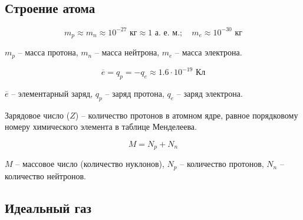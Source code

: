 \documentclass[12pt]{article}
\begin{document}
\subsection{Строение атома}
\begin{law}
    $$m_p\approx m_n\approx 10^{-27}\text{ кг}\approx 1\text{ а. е. м.};\quad m_e\approx 10^{-30} \text{ кг}$$
    \begin{center}
        \begin{minipage}{12cm}
            $m_p$ -- масса протона, $m_n$ -- масса нейтрона, $m_e$ -- масса электрона.
        \end{minipage}
    \end{center}
\end{law}
\begin{law}
    $$\overline{e}=q_p=-q_e\approx \num{1.6}\cdot 10^{-19}\text{ Кл}$$
    \begin{center}
        \begin{minipage}{13cm}
            \centering
            $\overline{e}$ -- элементарный заряд, $q_p$ -- заряд протона, $q_e$ -- заряд электрона.
        \end{minipage}
    \end{center}
\end{law}
\begin{definition}
    Зарядовое число ($Z$) -- количество протонов в атомном ядре, равное порядковому номеру химического элемента в таблице Менделеева.
\end{definition}
\begin{definition}
    $$M=N_p+N_n$$
    \begin{center}
        \begin{minipage}{12cm}
            $M$ -- массовое число (количество нуклонов), $N_p$ -- количество протонов, $N_n$ -- количество нейтронов.
        \end{minipage}
    \end{center}
\end{definition}

\subsection{Идеальный газ}
\end{document}
